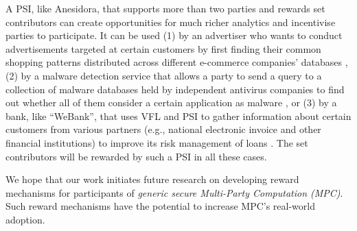 A PSI, like Anesidora, that supports more than two parties and rewards set contributors can create opportunities for much richer analytics and incentivise parties to participate. It can be used (1) by an advertiser who wants to conduct advertisements targeted at certain customers by first finding their common shopping patterns distributed across different e-commerce companies' databases \cite{IonKNPSS0SY20}, (2) by a malware detection service that allows a party to send a query to a collection of malware databases held by independent antivirus companies to find out whether all of them consider a certain application as malware \cite{TamrakarLPEPA17}, or (3) by a bank, like ``WeBank'', that uses VFL and PSI to gather information about certain customers from various partners (e.g., national electronic invoice and other financial institutions) to improve its risk management of loans \cite{ChengLCY20}. The set contributors will be rewarded by such a PSI in all these cases. 



We hope that our work initiates future research on developing reward mechanisms for participants of \emph{generic secure Multi-Party Computation (MPC)}. Such reward mechanisms have the potential to increase MPC's real-world adoption.  











%












%













